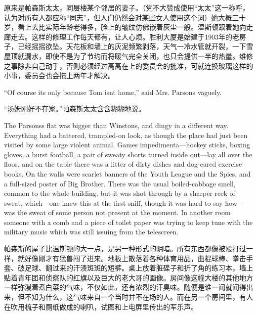 \begin{paracol}{2}
\switchcolumn

原来是帕森斯太太，同层楼某个邻居的妻子。（党不大赞成使用``太太''这一称呼，认为对所有人都应称``同志''，但人们仍然会对某些女人使用这个词）她大概三十岁，看上去比实际年龄老得多，脸上的皱纹仿佛嵌着灰尘一般。温斯顿跟着她向走廊走去。这样的修理工作每天都有，让人心烦。胜利大厦是始建于1903年的老房子，已经摇摇欲坠。天花板和墙上的灰泥频繁剥落，天气一冷水管就开裂，一下雪屋顶就漏水，即使不是为了节约而将暖气完全关闭，也只会提供一半的热量。维修之事除非自己动手，否则必须经过高高在上的委员会的批准，可就连换玻璃这样的小事，委员会也会拖上两年才解决。

\switchcolumn*

``Of course it\textquotesingle s only because Tom isn\textquotesingle t
home,'' said Mrs. Parsons vaguely.

\switchcolumn

``汤姆刚好不在家。''帕森斯太太含含糊糊地说。

\switchcolumn*

The Parsons\textquotesingle s flat was bigger than
Winston\textquotesingle s, and dingy in a different way. Everything had
a battered, trampled-on look, as though the place had just been visited
by some large violent animal. Games impedimenta---hockey sticks, boxing
gloves, a burst football, a pair of sweaty shorts turned inside
out---lay all over the floor, and on the table there was a litter of
dirty dishes and dog-eared exercise books. On the walls were scarlet
banners of the Youth League and the Spies, and a full-sized poster of
Big Brother. There was the usual boiled-cabbage smell, common to the
whole building, but it was shot through by a sharper reek of sweat,
which---one knew this at the first sniff, though it was hard to say
how---was the sweat of some person not present at the moment. In another
room someone with a comb and a piece of toilet paper was trying to keep
tune with the military music which was still issuing from the
telescreen.

\switchcolumn

帕森斯的屋子比温斯顿的大一点，是另一种形式的阴暗。所有东西都像被殴打过一样，就好像刚才有猛兽闯了进来。地板上散落着各种体育用品，曲棍球棒、拳击手套、破足球、翻过来的汗渍斑斑的短裤。桌上放着脏碟子和折了角的练习本，墙上贴着青年团和侦察队的红旗以及巨大的老大哥的画像。房间像这幢大楼的其他地方一样弥漫着煮白菜的气味，不仅如此，还有浓烈的汗臭味。随便是谁一闻就闻得出来，但不知为什么，这气味来自一个当时并不在场的人。而在另一个房间里，有人在吹用梳子和厕纸做成的喇叭，试图和上电屏里传出的军乐声。


\end{paracol}

